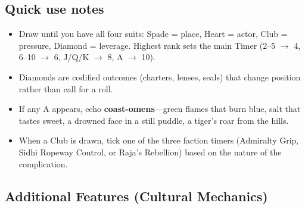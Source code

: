 \subsection*{Quick use notes}
\label{sec:brasscoast-quick-use}
\begin{itemize}
\item Draw until you have all four suits: Spade = place, Heart = actor, Club = pressure, Diamond = leverage. Highest rank sets the main Timer (2--5 \(\rightarrow\) 4, 6--10 \(\rightarrow\) 6, J/Q/K \(\rightarrow\) 8, A \(\rightarrow\) 10).
\item Diamonds are codified outcomes (charters, lenses, seals) that change position rather than call for a roll.
\item If any A appears, echo \textbf{coast-omens}---green flames that burn blue, salt that tastes sweet, a drowned face in a still puddle, a tiger's roar from the hills.
\item When a Club is drawn, tick one of the three faction timers (Admiralty Grip, Sidhi Ropeway Control, or Raja's Rebellion) based on the nature of the complication.
\end{itemize}

\subsection*{Additional Features (Cultural Mechanics)}
\label{sec:brasscoast-mechanics}

